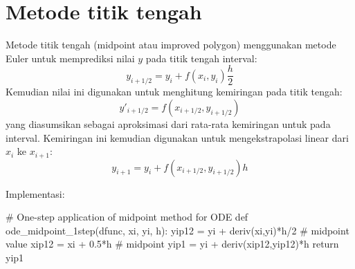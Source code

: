 \section{Metode titik tengah}

Metode titik tengah (midpoint atau improved polygon)
menggunakan metode Euler untuk memprediksi nilai $y$ pada titik tengah
interval:
\begin{equation*}
y_{i+1/2} = y_{i} + f(x_i, y_i) \frac{h}{2}
\end{equation*}
Kemudian nilai ini digunakan untuk menghitung kemiringan pada titik tengah:
\begin{equation*}
y'_{i+1/2} = f(x_{i+1/2}, y_{i+1/2})
\end{equation*}
yang diasumsikan sebagai aproksimasi dari rata-rata kemiringan untuk pada interval.
Kemiringan ini kemudian digunakan untuk mengekstrapolasi linear dari $x_i$ ke $x_{i+1}$:
\begin{equation}
y_{i+1} = y_{i} + f(x_{i+1/2}, y_{i+1/2}) h
\end{equation}

Implementasi:
\begin{pythoncode}
# One-step application of midpoint method for ODE
def ode_midpoint_1step(dfunc, xi, yi, h):
    yip12 = yi + deriv(xi,yi)*h/2  # midpoint value
    xip12 = xi + 0.5*h             # midpoint
    yip1 = yi + deriv(xip12,yip12)*h
    return yip1
\end{pythoncode}